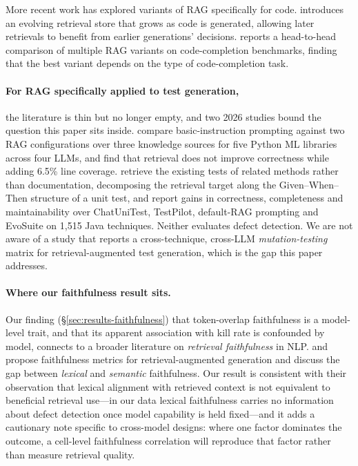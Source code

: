 \documentclass[smallextended]{svjour3}
\begin{document}
More recent work has explored variants of RAG specifically for code.
\citet{su2025evor} introduces an evolving retrieval store that grows
as code is generated, allowing later retrievals to benefit from
earlier generations' decisions. \citet{liu2025codereview} reports a
head-to-head comparison of multiple RAG variants on code-completion
benchmarks, finding that the best variant depends on the
type of code-completion task.

\paragraph{For RAG specifically applied to test generation,} the
literature is thin but no longer empty, and two 2026 studies bound
the question this paper sits inside. \citet{shin2026ragtest} compare
basic-instruction prompting against two RAG configurations over three
knowledge sources for five Python ML libraries across four LLMs, and
find that retrieval does not improve correctness while adding 6.5\%
line coverage. \citet{zhang2026refrag} retrieve the existing tests of
related methods rather than documentation, decomposing the retrieval
target along the Given--When--Then structure of a unit test, and
report gains in correctness, completeness and maintainability over
ChatUniTest, TestPilot, default-RAG prompting and EvoSuite on 1{,}515
Java techniques. Neither evaluates defect detection. We are not aware of
a study that reports a cross-technique, cross-LLM \emph{mutation-testing}
matrix for retrieval-augmented test generation, which is the gap this
paper addresses.

\paragraph{Where our faithfulness result sits.}
Our finding (\S\ref{sec:results-faithfulness}) that token-overlap
faithfulness is a model-level trait, and that its apparent
association with kill rate is confounded by model, connects to a
broader literature on \emph{retrieval faithfulness} in NLP.
\citet{maynez2020} and \citet{es2024ragas} propose faithfulness
metrics for retrieval-augmented generation and discuss the gap
between \emph{lexical} and \emph{semantic} faithfulness. Our
result is consistent with their observation that lexical alignment
with retrieved context is not equivalent to beneficial retrieval
use---in our data lexical faithfulness carries no information about
defect detection once model capability is held fixed---and it adds a
cautionary note specific to cross-model designs: where one factor
dominates the outcome, a cell-level faithfulness correlation will
reproduce that factor rather than measure retrieval quality.
\end{document}

